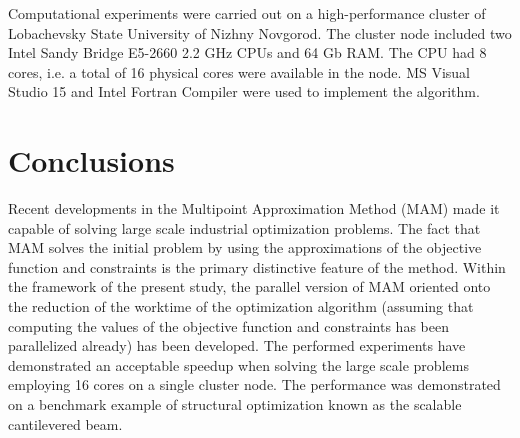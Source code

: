 \documentclass[runningheads,a4paper]{llncs}
\begin{document}
Computational experiments were carried out on a high-performance cluster of Lobachevsky State University of Nizhny Novgorod. The cluster node included two Intel Sandy Bridge E5-2660 2.2 GHz CPUs and 64 Gb RAM. The CPU had 8 cores, i.e. a total of 16 physical cores were available in the node. MS Visual Studio 15 and Intel Fortran Compiler were used to implement the algorithm.

\section{Conclusions}

Recent developments in the Multipoint Approximation Method (MAM) made it capable of solving large scale industrial optimization problems. The fact that MAM solves the initial problem by using the approximations of the objective function and constraints is the primary distinctive feature of the method. Within the framework of the present study, the parallel version of MAM oriented onto the reduction of the worktime of the optimization algorithm (assuming that computing the values of the objective function and constraints has been parallelized already) has been developed. The performed experiments have demonstrated an acceptable speedup when solving the large scale problems employing 16 cores on a single cluster node. The performance was demonstrated on a benchmark example of structural 
optimization known as the scalable cantilevered beam. 
\end{document}
